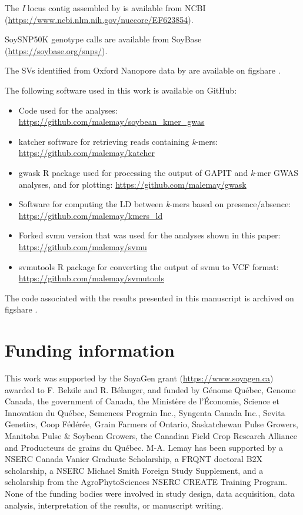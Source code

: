 \documentclass{article}
\begin{document}
The \textit{I} locus contig assembled by  is available from
NCBI (\url{https://www.ncbi.nlm.nih.gov/nuccore/EF623854}).

SoySNP50K genotype calls are available from SoyBase (\url{https://soybase.org/snps/}).

The SVs identified from Oxford Nanopore data by  are available
on figshare .

The following software used in this work is available on GitHub:

\begin{itemize}
	\item Code used for the analyses:
		\url{https://github.com/malemay/soybean_kmer_gwas}
	\item katcher software for retrieving reads containing \textit{k}-mers:
		\url{https://github.com/malemay/katcher}
	\item gwask R package used for processing the output of GAPIT and
		\textit{k}-mer GWAS analyses, and for plotting:
		\url{https://github.com/malemay/gwask}
	\item Software for computing the LD between \textit{k}-mers
		based on presence/absence: \url{https://github.com/malemay/kmers_ld}
	\item Forked svmu version that was used for the analyses shown in this
		paper: \url{https://github.com/malemay/svmu}
	\item svmutools R package for converting the output of svmu to VCF
		format: \url{https://github.com/malemay/svmutools}
\end{itemize}

The code associated with the results presented in this manuscript is archived
on figshare .

\section*{Funding information}

This work was supported by the SoyaGen grant (\url{https://www.soyagen.ca})
awarded to F. Belzile and R. Bélanger, and funded by Génome Québec, Genome
Canada, the government of Canada, the Ministère de l'Économie, Science et
Innovation du Québec, Semences Prograin Inc., Syngenta Canada Inc., Sevita
Genetics, Coop Fédérée, Grain Farmers of Ontario, Saskatchewan Pulse Growers,
Manitoba Pulse \& Soybean Growers, the Canadian Field Crop Research Alliance
and Producteurs de grains du Québec. M-A. Lemay has been supported by a NSERC
Canada Vanier Graduate Scholarship, a FRQNT doctoral B2X scholarship, a NSERC
Michael Smith Foreign Study Supplement, and a scholarship from the
AgroPhytoSciences NSERC CREATE Training Program. None of the funding bodies
were involved in study design, data acquisition, data analysis, interpretation
of the results, or manuscript writing.
\end{document}
